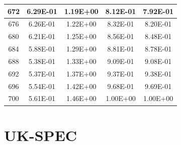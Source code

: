 \begin{longtable}{c||c|c|c|c}
        672 & 6.29E-01 & 1.19E+00 & 8.12E-01 & 7.92E-01 \\ \hline
        676 & 6.26E-01 & 1.22E+00 & 8.32E-01 & 8.20E-01 \\ \hline
        680 & 6.21E-01 & 1.25E+00 & 8.56E-01 & 8.48E-01 \\ \hline
        684 & 5.88E-01 & 1.29E+00 & 8.81E-01 & 8.78E-01 \\ \hline
        688 & 5.38E-01 & 1.33E+00 & 9.09E-01 & 9.08E-01 \\ \hline
        692 & 5.37E-01 & 1.37E+00 & 9.37E-01 & 9.38E-01 \\ \hline
        696 & 5.54E-01 & 1.42E+00 & 9.68E-01 & 9.69E-01 \\ \hline
        700 & 5.61E-01 & 1.46E+00 & 1.00E+00 & 1.00E+00 \\
\end{longtable}

\twocolumn

\chapter{UK-SPEC}
\clearpage
